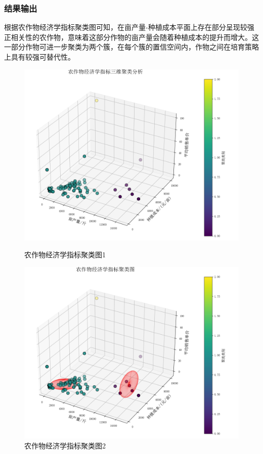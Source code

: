 \documentclass[12pt]{ctexart}
\begin{document}
	\subsubsection{结果输出}
	
	
	  根据农作物经济学指标聚类图可知，在亩产量-种植成本平面上存在部分呈现较强正相关性的农作物，意味着这部分作物的亩产量会随着种植成本的提升而增大。这一部分作物可进一步聚类为两个簇，在每个簇的置信空间内，作物之间在培育策略上具有较强可替代性。
	  \newline
		\begin{figure}[h]
		\centering
		\begin{minipage}{0.48\textwidth}
			\centering
			\includegraphics[width=\linewidth]{image12.png}
			\caption{农作物经济学指标聚类图1}
			\label{fig:yield_comparison1}
		\end{minipage}\hfill
		\begin{minipage}{0.48\textwidth}
			\centering
			\includegraphics[width=\linewidth]{image11.png}
			\caption{农作物经济学指标聚类图2}
			\label{fig:yield_comparison2}
		\end{minipage}
	\end{figure}
	
\end{document}
